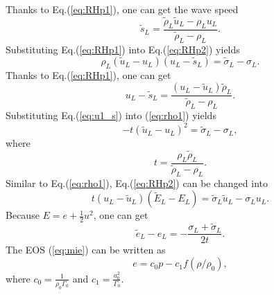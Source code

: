 \documentclass[review]{elsarticle}
\begin{document}
 Thanks to Eq.(\ref{eq:RHp1}), one can get the wave speed
  \begin{equation}
    \widetilde{s}_L = \frac{\widetilde{\rho}_L \widetilde{u}_L-\rho_Lu_L}{\widetilde{\rho}_L-\rho_L}.
  \end{equation}
Substituting Eq.(\ref{eq:RHp1}) into Eq.(\ref{eq:RHp2}) yields
\begin{equation}\label{eq:rho1}
  \rho_L(\widetilde{u}_L - u_L)(u_L-\widetilde{s}_L) = \widetilde{\sigma}_L -\sigma_L.
\end{equation}
 Thanks to Eq.(\ref{eq:RHp1}), one can get
\begin{equation}\label{eq:u1_s}
  u_L-\widetilde{s}_L = \frac{(u_L-\widetilde{u}_L)\widetilde{\rho}_L}{\widetilde{\rho}_L-\rho_L}.
\end{equation}
Substituting Eq.(\ref{eq:u1_s}) into (\ref{eq:rho1}) yields
\begin{equation}\label{eq:tu_2}
  -t(\widetilde{u}_L-u_L)^2 = \widetilde{\sigma}_L-\sigma_L,
\end{equation}
where
\begin{equation}
t=\frac{\rho_L \widetilde{\rho}_L}{\widetilde{\rho}_L-\rho_L}.
\end{equation}
Similar to Eq.(\ref{eq:rho1}), Eq.(\ref{eq:RHp2}) can be changed into
\begin{equation}
  t(u_L-\widetilde{u}_L)(\widetilde{E}_L-E_L) =\widetilde{\sigma}_L\widetilde{u}_L-\sigma_Lu_L.
\end{equation}
Because $E = e+\frac{1}{2}u^2$, one can get
\begin{equation}\label{eq:e21}
  \widetilde{e}_L-e_L= -\frac{\sigma_L+\widetilde{\sigma}_L}{2t}.
\end{equation}
The EOS (\ref{eq:mie}) can be written as
\begin{equation} \label{eq:eos1}
  e=c_0 p-c_1f(\rho/\rho_0),
\end{equation}
where $c_0=\frac{1}{\rho_0\Gamma_0}$ and $c_1=\frac{a_0^2}{\Gamma_0}$.
\end{document}
